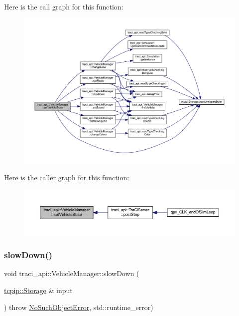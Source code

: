 Here is the call graph for this function\+:
\nopagebreak
\begin{figure}[H]
\begin{center}
\leavevmode
\includegraphics[width=350pt]{classtraci__api_1_1_vehicle_manager_a7b3c7300d7b091527ed296652701c471_cgraph}
\end{center}
\end{figure}
Here is the caller graph for this function\+:
\nopagebreak
\begin{figure}[H]
\begin{center}
\leavevmode
\includegraphics[width=350pt]{classtraci__api_1_1_vehicle_manager_a7b3c7300d7b091527ed296652701c471_icgraph}
\end{center}
\end{figure}
\mbox{\label{classtraci__api_1_1_vehicle_manager_afaa8625978e32aab7ca85cd52ce450a8}} 
\subsubsection{\texorpdfstring{slow\+Down()}{slowDown()}}
{\footnotesize\ttfamily void traci\+\_\+api\+::\+Vehicle\+Manager\+::slow\+Down (\begin{DoxyParamCaption}\item[{\hyperlink{classtcpip_1_1_storage}{tcpip\+::\+Storage} \&}]{input }\end{DoxyParamCaption}) throw  \hyperlink{classtraci__api_1_1_no_such_object_error}{No\+Such\+Object\+Error}, std\+::runtime\+\_\+error) }

